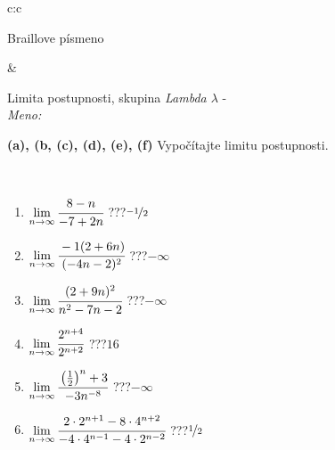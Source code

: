 \documentclass[10pt]{report}
\begin{document}
\begin{tabular}{c:c}
\begin{minipage}[c][104.5mm][t]{0.5\linewidth}
\begin{center}
\begin{minipage}{0.20\linewidth}
\begin{center}
{\small Braillove písmeno}
\end{center}
\end{minipage}
\end{center}
\end{minipage}
&
\begin{minipage}[c][104.5mm][t]{0.5\linewidth}
\begin{center}
\vspace{5mm}
{\huge Limita postupnosti, skupina \textit{Lambda $\lambda$} -}\\[5mm]
\textit{Meno:}\phantom{xxxxxxxxxxxxxxxxxxxxxxxxxxxxxxxxxxxxxxxxxxxxxxxxxxxxxxxxxxxxxxxxx}\\[5mm]
\begin{minipage}{0.95\linewidth}
\begin{center}
{
\textbf{(a), (b, (c), (d), (e), (f)} Vypočítajte limitu postupnosti. \\[-1mm]
\phantom{x}
}
\end{center}
\end{minipage}
\\[1mm]
\begin{minipage}{0.79\linewidth}
\begin{center}
\begin{varwidth}{\linewidth}
\setlength{\itemsep}{0pt}
\begin{enumerate}
\normalsize
\item $\lim\limits_{n\to\infty}\cfrac{8-n}{-7+2n}$\quad \dotfill\; ???\;\dotfill \quad $\nicefrac{-1}{2}$
\item $\lim\limits_{n\to\infty}\cfrac{-1(2+6n)}{(-4n-2)^2}$\quad \dotfill\; ???\;\dotfill \quad $-\infty$
\item $\lim\limits_{n\to\infty}\cfrac{(2+9n)^2}{n^2-7n-2}$\quad \dotfill\; ???\;\dotfill \quad $-\infty$
\item $\lim\limits_{n\to\infty}\cfrac{2^{n+4}}{2^{n+2}}$\quad \dotfill\; ???\;\dotfill \quad $16$
\item $\lim\limits_{n\to\infty}\cfrac{\left(\frac{1}{2}\right)^n +3}{-3n^{-8}}$\quad \dotfill\; ???\;\dotfill \quad $-\infty$
\item $\lim\limits_{n\to\infty}\cfrac{2\cdot 2^{n+1}-8\cdot 4^{n+2}}{-4\cdot 4^{n-1}-4\cdot 2^{n-2}}$\quad \dotfill\; ???\;\dotfill \quad $\nicefrac{1}{2}$
\end{enumerate}
\end{varwidth}
\end{center}
\end{minipage}
\begin{minipage}{0.20\linewidth}

\end{minipage}
\end{center}
\end{minipage}
\end{tabular}
\end{document}
